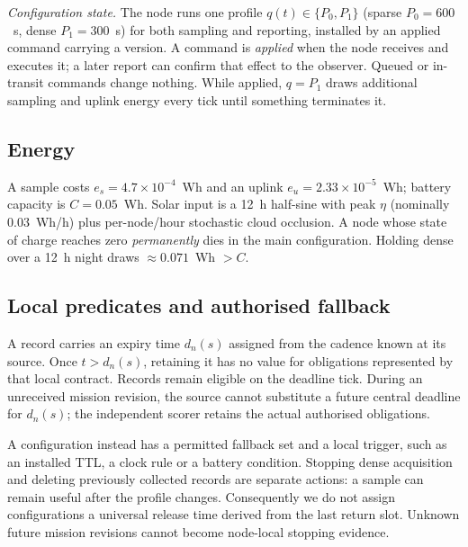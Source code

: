 \documentclass[journal,10pt]{IEEEtran}
\begin{document}
\emph{Configuration state.} The node runs one profile $q(t)\in\{P_0,P_1\}$ (sparse
$P_0{=}600$~s, dense $P_1{=}300$~s) for both sampling and reporting, installed by an applied
command carrying a version. A command is \emph{applied} when the node receives and executes it;
a later report can confirm that effect to the observer. Queued or in-transit commands change
nothing. While applied,
$q{=}P_1$ draws additional sampling and uplink energy every tick until something terminates it.

\subsection{Energy}
A sample costs $e_s{=}4.7{\times}10^{-4}$~Wh and an uplink $e_u{=}2.33{\times}10^{-5}$~Wh;
battery capacity is $C{=}0.05$~Wh. Solar input is a 12~h half-sine with peak $\eta$ (nominally
$0.03$~Wh/h) plus per-node/hour stochastic cloud occlusion. A node whose state of charge reaches
zero \emph{permanently} dies in the main configuration. Holding dense over a 12~h night draws
$\approx0.071$~Wh $>C$.

\subsection{Local predicates and authorised fallback}
A record carries an expiry time $d_n(s)$ assigned from the cadence known at its source. Once
$t>d_n(s)$, retaining it has no value for obligations represented by that local contract.
Records remain eligible on the deadline tick. During an unreceived mission revision, the source
cannot substitute a future central deadline for $d_n(s)$; the independent scorer retains the
actual authorised obligations.

A configuration instead has a permitted fallback set and a local trigger, such as an installed
TTL, a clock rule or a battery condition. Stopping dense acquisition and deleting previously
collected records are separate actions: a sample can remain useful after the profile changes.
Consequently we do not assign configurations a universal release time derived from the last
return slot. Unknown future mission revisions cannot become node-local stopping evidence.
\end{document}
